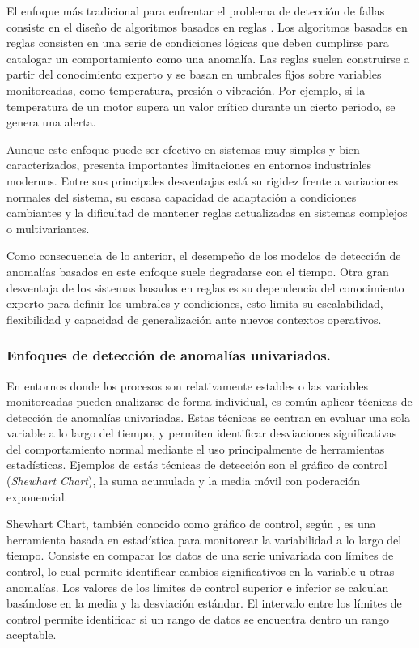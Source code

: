 \documentclass[11pt,a4paper,spanish]{book}
\numberwithin{equation}{chapter}
\numberwithin{figure}{chapter}
\begin{document}
El enfoque más tradicional para enfrentar el problema de detección de fallas consiste en 
el diseño de algoritmos basados en reglas \cite{gami2024datacleansing}. Los algoritmos 
basados en reglas consisten en una serie de condiciones lógicas que deben cumplirse para
catalogar un comportamiento como una anomalía. 
Las reglas suelen construirse a partir del 
conocimiento experto y se basan en umbrales fijos sobre variables monitoreadas, como 
temperatura, presión o vibración. Por ejemplo, si la temperatura de un motor supera un 
valor crítico durante un cierto periodo, se genera una alerta. 


Aunque este enfoque puede ser efectivo en sistemas muy simples y bien caracterizados, 
presenta importantes limitaciones en entornos industriales modernos. 
Entre sus principales desventajas está su rigidez frente a variaciones normales del 
sistema, su escasa capacidad de adaptación a condiciones cambiantes y la dificultad 
de mantener reglas actualizadas en sistemas complejos o multivariantes. 


Como consecuencia de lo anterior, el desempeño de los modelos de detección de 
anomalías basados en este enfoque suele degradarse con el tiempo. 
Otra gran desventaja de los sistemas basados en reglas es su dependencia del 
conocimiento experto para definir los umbrales y condiciones, esto limita su 
escalabilidad, flexibilidad y capacidad de generalización ante nuevos contextos 
operativos.


\subsubsection{Enfoques de detección de anomalías univariados.}


En entornos donde los procesos son relativamente estables o las variables monitoreadas 
pueden analizarse de forma individual, es común aplicar técnicas de detección de 
anomalías univariadas. 
Estas técnicas se centran en evaluar una sola variable a lo largo del tiempo, y 
permiten identificar desviaciones significativas del comportamiento normal mediante el 
uso principalmente de herramientas estadísticas. Ejemplos de estás técnicas de 
detección son el gráfico de control (\textit{Shewhart Chart}), la suma acumulada y la
media móvil con poderación exponencial. 


Shewhart Chart, también conocido como gráfico de control, según \cite{chen1998shewhart}, 
es una herramienta basada en estadística para monitorear la variabilidad a lo largo del tiempo. 
Consiste en comparar los datos de una serie univariada con límites de control, 
lo cual permite identificar cambios significativos en la variable u otras anomalías. 
Los valores de los límites de control superior e inferior se calculan basándose en la 
media y la desviación estándar. El intervalo entre los límites de control permite 
identificar si un rango de datos se encuentra dentro un rango aceptable. 
\end{document}
